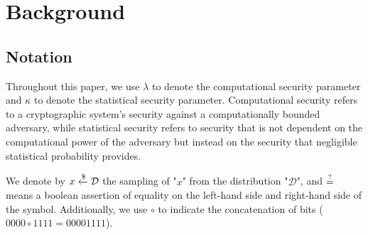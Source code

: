 \section{Background}
\label{sec:background}

\subsection{Notation}
Throughout this paper, we use $\lambda$ to denote the computational security parameter and $\kappa$ to denote the statistical security parameter. Computational security refers to a cryptographic system's security against a computationally bounded adversary, while statistical security refers to security that is not dependent on the computational power of the adversary but instead on the security that negligible statistical probability provides.

We denote by $x \xleftarrow{\$} \mathcal D$ the sampling of "$x$" from the distribution "$\mathcal D$", and $\overset {?} {=}$ means a boolean assertion of equality on the left-hand side and right-hand side of the symbol. Additionally, we use $\circ$ to indicate the concatenation of bits ($0000 \circ 1111 = 00001111$).

















